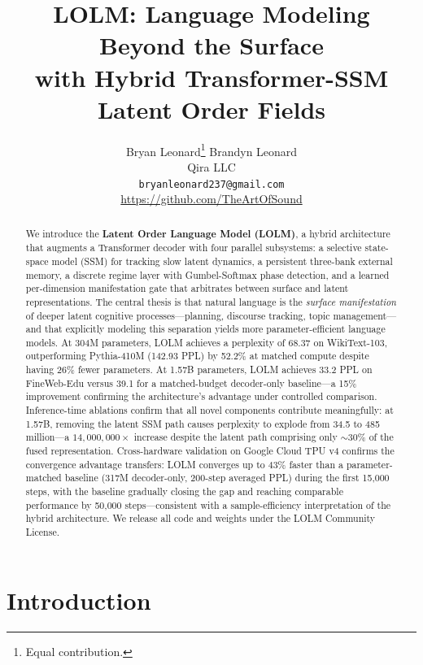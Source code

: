 \documentclass{article}
\title{LOLM: Language Modeling Beyond the Surface\\with Hybrid Transformer-SSM Latent Order Fields}
\author{
  Bryan Leonard\thanks{Equal contribution.} \quad Brandyn Leonard\footnotemark[1] \\
  Qira LLC \\
  \texttt{bryanleonard237@gmail.com} \\
  \url{https://github.com/TheArtOfSound}
}
\begin{document}
\maketitle

\begin{abstract}
We introduce the \textbf{Latent Order Language Model (LOLM)}, a hybrid
architecture that augments a Transformer decoder with four parallel subsystems:
a selective state-space model (SSM) for tracking slow latent dynamics, a
persistent three-bank external memory, a discrete regime layer with
Gumbel-Softmax phase detection, and a learned per-dimension manifestation gate
that arbitrates between surface and latent representations. The central thesis
is that natural language is the \emph{surface manifestation} of deeper latent
cognitive processes---planning, discourse tracking, topic management---and that
explicitly modeling this separation yields more parameter-efficient language
models. At 304M parameters, LOLM achieves a perplexity of 68.37 on
WikiText-103, outperforming Pythia-410M (142.93 PPL) by 52.2\% at matched
compute despite having 26\% fewer parameters. At 1.57B parameters, LOLM
achieves 33.2 PPL on FineWeb-Edu versus 39.1 for a matched-budget
decoder-only baseline---a 15\% improvement confirming the architecture's
advantage under controlled comparison. Inference-time ablations confirm that
all novel components contribute meaningfully: at 1.57B, removing the latent
SSM path causes perplexity to explode from 34.5 to 485 million---a
$14{,}000{,}000\times$ increase despite the latent path comprising only
${\sim}30\%$ of the fused representation. Cross-hardware validation on
Google Cloud TPU v4 confirms the convergence advantage transfers: LOLM
converges up to 43\% faster than a parameter-matched baseline (317M
decoder-only, 200-step averaged PPL) during the first 15{,}000 steps,
with the baseline gradually closing the gap and reaching comparable
performance by 50{,}000 steps---consistent with a sample-efficiency
interpretation of the hybrid architecture.
We release all code and weights under the LOLM Community License.
\end{abstract}

\section{Introduction}
\label{sec:intro}
\end{document}
